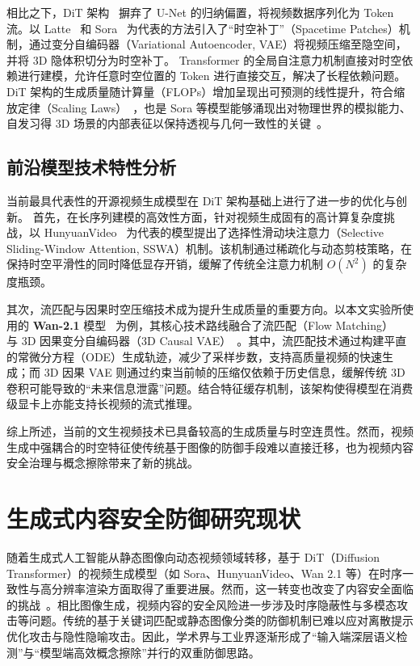 相比之下，DiT 架构~\cite{peebles2023scalable} 摒弃了 U-Net 的归纳偏置，将视频数据序列化为 Token 流。以 Latte~\cite{ma2024latte} 和 Sora~\cite{brooks2024video} 为代表的方法引入了“时空补丁”（Spacetime Patches）机制，通过变分自编码器（Variational Autoencoder, VAE）将视频压缩至隐空间，并将 3D 隐体积切分为时空补丁。
Transformer 的全局自注意力机制直接对时空依赖进行建模，允许任意时空位置的 Token 进行直接交互，解决了长程依赖问题。
DiT 架构的生成质量随计算量（FLOPs）增加呈现出可预测的线性提升，符合缩放定律（Scaling Laws）~\cite{kaplan2020scaling, peebles2023scalable}，也是 Sora 等模型能够涌现出对物理世界的模拟能力、自发习得 3D 场景的内部表征以保持透视与几何一致性的关键~\cite{brooks2024video}。

\subsection{前沿模型技术特性分析}
当前最具代表性的开源视频生成模型在 DiT 架构基础上进行了进一步的优化与创新。
首先，在长序列建模的高效性方面，针对视频生成固有的高计算复杂度挑战，以 HunyuanVideo~\cite{hunyuanvideo} 为代表的模型提出了选择性滑动块注意力（Selective Sliding-Window Attention, SSWA）机制。该机制通过稀疏化与动态剪枝策略，在保持时空平滑性的同时降低显存开销，缓解了传统全注意力机制 $O(N^2)$ 的复杂度瓶颈。

其次，流匹配与因果时空压缩技术成为提升生成质量的重要方向。以本文实验所使用的 \textbf{Wan-2.1} 模型~\cite{wan2.1} 为例，其核心技术路线融合了流匹配（Flow Matching）~\cite{lipman2022flow} 与 3D 因果变分自编码器（3D Causal VAE）~\cite{blattmann2023stable}。其中，流匹配技术通过构建平直的常微分方程（ODE）生成轨迹，减少了采样步数，支持高质量视频的快速生成；而 3D 因果 VAE 则通过约束当前帧的压缩仅依赖于历史信息，缓解传统 3D 卷积可能导致的“未来信息泄露”问题。结合特征缓存机制，该架构使得模型在消费级显卡上亦能支持长视频的流式推理。

综上所述，当前的文生视频技术已具备较高的生成质量与时空连贯性。然而，视频生成中强耦合的时空特征使传统基于图像的防御手段难以直接迁移，也为视频内容安全治理与概念擦除带来了新的挑战。

\section{生成式内容安全防御研究现状}

随着生成式人工智能从静态图像向动态视频领域转移，基于 DiT（Diffusion Transformer）的视频生成模型（如 Sora、HunyuanVideo、Wan 2.1 等）在时序一致性与高分辨率渲染方面取得了重要进展。然而，这一转变也改变了内容安全面临的挑战~\cite{Lu2024DisguisedCI, bozard2024does, Zhang2023OnCR, Carlini2023ExtractingTD, Webster2023ARE, Somepalli2023UnderstandingAM}。相比图像生成，视频内容的安全风险进一步涉及时序隐蔽性与多模态攻击等问题。传统的基于关键词匹配或静态图像分类的防御机制已难以应对离散提示优化攻击与隐性隐喻攻击。因此，学术界与工业界逐渐形成了“输入端深层语义检测”与“模型端高效概念擦除”并行的双重防御思路。

